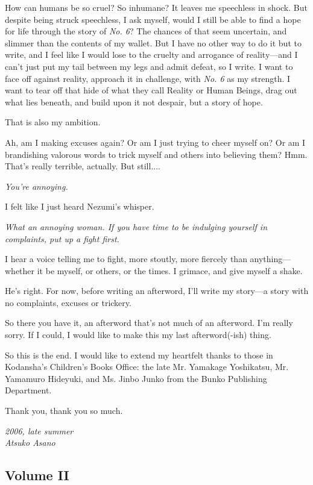 How can humans be so cruel? So inhumane? It leaves me speechless in
shock. But despite being struck speechless, I ask myself, would I still
be able to find a hope for life through the story of \emph{No. 6}? The chances
of that seem uncertain, and slimmer than the contents of my wallet. But
I have no other way to do it but to write, and I feel like I would lose
to the cruelty and arrogance of reality---and I can't just put my tail
between my legs and admit defeat, so I write. I want to face off against
reality, approach it in challenge, with \emph{No. 6} as my strength. I want to
tear off that hide of what they call Reality or Human Beings, drag out
what lies beneath, and build upon it not despair, but a story of hope.

That is also my ambition.

Ah, am I making excuses again? Or am I just trying to cheer myself on?
Or am I brandishing valorous words to trick myself and others into
believing them? Hmm. That's really terrible, actually. But still....

\emph{You're annoying.}

I felt like I just heard Nezumi's whisper.

\emph{What an annoying woman. If you have time to be indulging yourself
in complaints, put up a fight first.}

I hear a voice telling me to fight, more stoutly, more fiercely than
anything---whether it be myself, or others, or the times. I grimace, and
give myself a shake.

He's right. For now, before writing an afterword, I'll write my story---a
story with no complaints, excuses or trickery.

So there you have it, an afterword that's not much of an afterword. I'm
really sorry. If I could, I would like to make this my last
afterword(-ish) thing.

So this is the end. I would like to extend my heartfelt thanks to those
in Kodansha's Children's Books Office: the late Mr. Yamakage Yoshikatsu,
Mr. Yamamuro Hideyuki, and Ms. Jinbo Junko from the Bunko Publishing
Department.

Thank you, thank you so much.

\myspace

\emph{2006, late summer\\
Atsuko Asano}

\subsection{Volume II}
